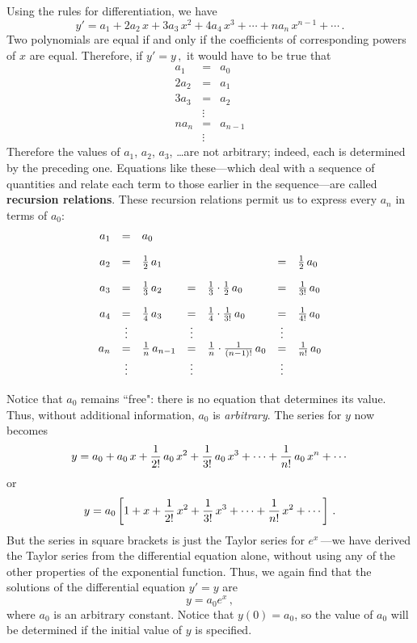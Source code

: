 {{{{Using the rules for differentiation, we have
\[
y'= a_1 + 2a_2\,x + 3 a_3\,x^2 + 4 a_4\,x^3 + \cdots + n a_n\,x^{n-1} + \cdots
\, .
\]
Two polynomials are equal if and only if the coefficients of corresponding powers of $x$ are equal.  Therefore, if $y'=y\,,$ it would have to be true that
\begin{eqnarray*}
a_1 & = & a_0 \\
2 a_2 & = & a_1 \\
3 a_3 & = & a_2 \\
&\vdots&  \\
n a_n & = & a_{n-1} \\
& \vdots& 
\end{eqnarray*}
Therefore the values of $a_1$, $a_2$, $a_3$, \ldots are not arbitrary; indeed, each is determined by the preceding one.  Equations like these---which deal with a sequence of quantities and relate each term to those earlier in the sequence---are called {\bf recursion relations}.  These recursion relations permit us to express every $a_n$ in terms of $a_0$: \\
\[
\begin{array}{rclclcl}
a_1 & = & a_0 &&&&\\ [.15in]
a_2 & = & {1 \over 2} \, a_1 && &=&{1 \over 2} \, a_0 \\ [.15in]
a_3 & = & {1 \over 3} \, a_2 &= &{1 \over 3}\cdot {1 \over 2} \, a_0 &= &
{1 \over 3!} \, a_0 \\ [.15in]
a_4 & = & {1 \over 4} \, a_3& =& {1 \over 4}\cdot{1 \over 3!} \, a_0 &= &
{1 \over 4!} \, a_0 \\
 &\vdots& &\vdots& &\vdots& \\
a_n & = & {1 \over n} \, a_{n-1} &= &{1 \over n}\cdot{1 \over (n-1)!} \, a_0 &=& {1 \over n!} \, a_0 \\
& \vdots&  &\vdots & &\vdots&
\end{array}
\]

Notice that $a_0$ remains ``free":  there is no equation that determines its value.  Thus, without additional information, $a_0$ is {\em arbitrary}.  The series for $y$ now becomes
\[
y = a_0 + a_0\, x + {1 \over 2!} \, a_0 \,x^2 + {1 \over 3!} \, a_0 \,x^3 + \cdots +
{1 \over n!} \, a_0 \,x^n + \cdots
\]
or
\[
y = a_0\left[1 + x + {1 \over 2!} \, x^2 + {1 \over 3!} \, x^3 + \cdots +
{1 \over n!} \, x^2 + \cdots \right] \, .
\]
But the series in square brackets is just the Taylor series for $e^x \,$---we have derived the Taylor series from the differential equation alone, without using any of the other properties of the exponential function.  Thus, we again find that the solutions of the differential equation $y'=y$ are
\[
y=a_0e^x \, ,
\]
where $a_0$ is an arbitrary constant.  Notice that $y(0)=a_0$, so the value of $a_0$ will be determined if the initial value of $y$ is specified.




}}}}
